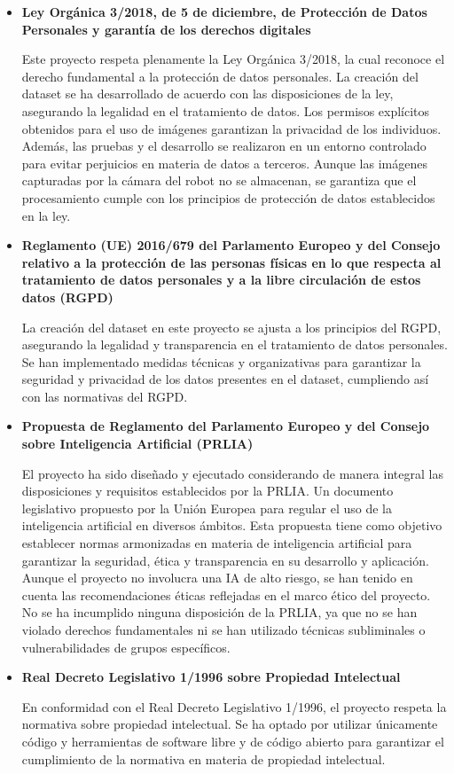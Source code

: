 \documentclass[12pt,a4paper,onecolumn,oneside]{report}
\begin{document}
\begin{itemize}
    \item \textbf{Ley Orgánica 3/2018, de 5 de diciembre, de Protección de Datos Personales y garantía de los derechos digitales}\cite{LOPD2018}
    
    Este proyecto respeta plenamente la Ley Orgánica 3/2018, la cual reconoce el derecho fundamental a la protección de datos personales. La creación del dataset se ha desarrollado de acuerdo con las disposiciones de la ley, asegurando la legalidad en el tratamiento de datos. Los permisos explícitos obtenidos para el uso de imágenes garantizan la privacidad de los individuos. Además, las pruebas y el desarrollo se realizaron en un entorno controlado para evitar perjuicios en materia de datos a terceros. Aunque las imágenes capturadas por la cámara del robot no se almacenan, se garantiza que el procesamiento cumple con los principios de protección de datos establecidos en la ley.
    \item \textbf{Reglamento (UE) 2016/679 del Parlamento Europeo y del Consejo relativo a la protección de las personas físicas en lo que respecta al tratamiento de datos personales y a la libre circulación de estos datos (RGPD)}\cite{RGPD2016}

    La creación del dataset en este proyecto se ajusta a los principios del RGPD, asegurando la legalidad y transparencia en el tratamiento de datos personales. Se han implementado medidas técnicas y organizativas para garantizar la seguridad y privacidad de los datos presentes en el dataset, cumpliendo así con las normativas del RGPD.
    \item \textbf{Propuesta de Reglamento del Parlamento Europeo y del Consejo sobre Inteligencia Artificial (PRLIA)}\cite{PRIA2021}

    El proyecto ha sido diseñado y ejecutado considerando de manera integral las disposiciones y requisitos establecidos por la PRLIA. Un documento legislativo propuesto por la Unión Europea para regular el uso de la inteligencia artificial en diversos ámbitos. Esta propuesta tiene como objetivo establecer normas armonizadas en materia de inteligencia artificial para garantizar la seguridad, ética y transparencia en su desarrollo y aplicación. Aunque el proyecto no involucra una IA de alto riesgo, se han tenido en cuenta las recomendaciones éticas reflejadas en el marco ético del proyecto. No se ha incumplido ninguna disposición de la PRLIA, ya que no se han violado derechos fundamentales ni se han utilizado técnicas subliminales o vulnerabilidades de grupos específicos.
    \item \textbf{Real Decreto Legislativo 1/1996 sobre Propiedad Intelectual}\cite{RDL1996}
    
    En conformidad con el Real Decreto Legislativo 1/1996, el proyecto respeta la normativa sobre propiedad intelectual. Se ha optado por utilizar únicamente código y herramientas de software libre y de código abierto para garantizar el cumplimiento de la normativa en materia de propiedad intelectual.
\end{itemize}
\end{document}

